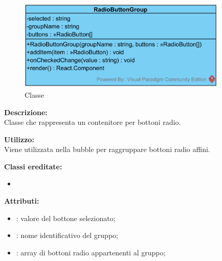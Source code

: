 \paragraph[::RadioButtonGroup]{\class}\mbox{}\\ \label{\class}
\begin{figure}[H]
	\centering
	\includegraphics[width=10cm]{./diagrammi/framework/view/gui/radiobuttongroup.png}
	\caption{Classe \class}
\end{figure}
\textbf{Descrizione:}\\
Classe che rappresenta un contenitore per bottoni radio.

\textbf{Utilizzo:}\\
Viene utilizzata nella bubble per raggruppare bottoni radio affini.

\textbf{Classi ereditate:}
\begin{itemize}
	\item {}
\end{itemize}


\textbf{Attributi:}
\begin{itemize}
	\item {}: valore del bottone selezionato;
	\item {}: nome identificativo del gruppo;
	\item {}: array di bottoni radio appartenenti al gruppo;
\end{itemize}

